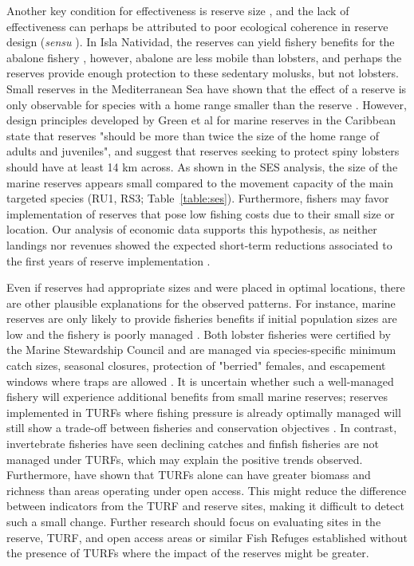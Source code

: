 \documentclass[10pt,letterpaper]{article}
\begin{document}
Another key condition for effectiveness is reserve size \cite{edgar_2014-UO}, and the lack of effectiveness can perhaps be attributed to poor ecological coherence in reserve design (\emph{sensu} \cite{rees_2018}). In Isla Natividad, the reserves can yield fishery benefits for the abalone fishery \cite{rossetto_2015-V0}, however, abalone are less mobile than lobsters, and perhaps the reserves provide enough protection to these sedentary molusks, but not lobsters. Small reserves in the Mediterranean Sea have shown that the effect of a reserve is only observable for species with a home range smaller than the reserve \cite{difranco_2018}. However, design principles developed by Green et al \cite{green_2017} for marine reserves in the Caribbean state that reserves "should be more than twice the size of the home range of adults and juveniles", and suggest that reserves seeking to protect spiny lobsters should have at least 14 km across. As shown in the SES analysis, the size of the marine reserves appears small compared to the movement capacity of the main targeted species (RU1, RS3; Table~\ref{table:ses}). Furthermore, fishers may favor implementation of reserves that pose low fishing costs due to their small size or location. Our analysis of economic data supports this hypothesis, as neither landings nor revenues showed the expected short-term reductions associated to the first years of reserve implementation \cite{ovando_2016-Wg}.

Even if reserves had appropriate sizes and were placed in optimal locations, there are other plausible explanations for the observed patterns. For instance, marine reserves are only likely to provide fisheries benefits if initial population sizes are low and the fishery is poorly managed \cite{hilborn_2004,hilborn_2006}. Both lobster fisheries were certified by the Marine Stewardship Council and are managed via species-specific minimum catch sizes, seasonal closures, protection of "berried" females, and escapement windows where traps are allowed \cite{dof_website_1993}. It is uncertain whether such a well-managed fishery will experience additional benefits from small marine reserves; reserves implemented in TURFs where fishing pressure is already optimally managed will still show a trade-off between fisheries and conservation objectives \cite{lester_2017}. In contrast, invertebrate fisheries have seen declining catches and finfish fisheries are not managed under TURFs, which may explain the positive trends observed. Furthermore, \cite{gelcich_2008} have shown that TURFs alone can have greater biomass and richness than areas operating under open access. This might reduce the difference between indicators from the TURF and reserve sites, making it difficult to detect such a small change. Further research should focus on evaluating sites in the reserve, TURF, and open access areas or similar Fish Refuges established without the presence of TURFs where the impact of the reserves might be greater.
\end{document}
